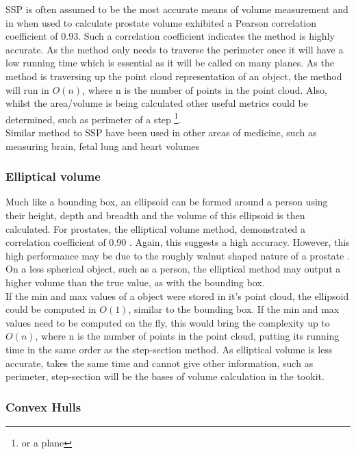 SSP is often assumed to be the most accurate means of volume measurement and in when used to calculate prostate volume \cite{K1991} exhibited a Pearson correlation coefficient of 0.93. 
Such a correlation coefficient indicates the method is highly accurate.
As the method only needs to traverse the perimeter once it will have a low running time which is essential as it will be called on many planes. As the method is traversing up the point cloud representation of an object, the method will run in $O(n)$, where n is the number of points in the point cloud. Also, whilst the area/volume is being calculated other useful metrics could be determined, such as perimeter of a step \footnote{or a plane}.\\

Similar method to SSP have been used in other areas of medicine, such as measuring brain, fetal lung and heart volumes \cite{Rosen1990,Rypens2001,}

\subsubsection{Elliptical volume}
Much like a bounding box, an ellipsoid can be formed around a person using their height, depth and breadth and the volume of this ellipsoid is then calculated.
For prostates, the elliptical volume method, demonstrated a correlation coefficient of 0.90 \cite{K1991}. Again, this suggests a high accuracy.
However, this high performance may be due to the roughly walnut shaped nature of a prostate . 
On a less spherical object, such as a person, the elliptical method may output a higher volume than the true value, as with the bounding box.\\

If the min and max values of a object were stored in it's point cloud, the ellipsoid could be computed in $O(1)$, similar to the bounding box. 
If the min and max values need to be computed on the fly, this would bring the complexity up to $O(n)$, where n is the number of points in the point cloud, putting its running time in the same order as the step-section method.
As elliptical volume is less accurate, takes the same time and cannot give other information, such as perimeter, step-section will be the bases of volume calculation in the tookit.

\subsubsection{Convex Hulls}
